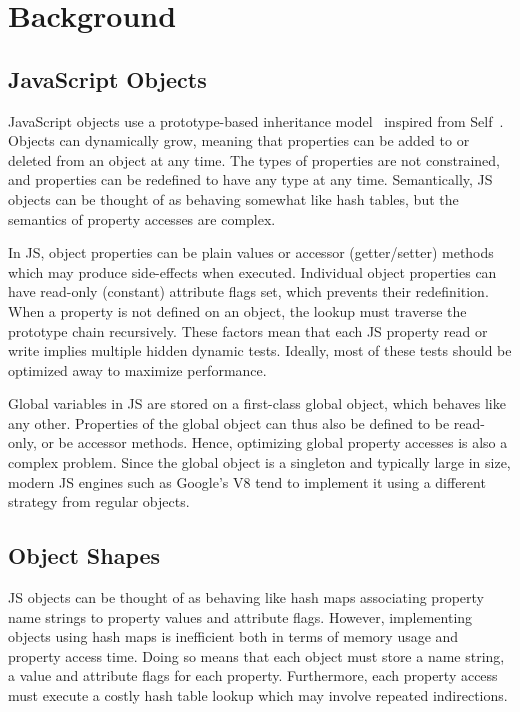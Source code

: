 \documentclass[preprint]{sigplanconf}
\begin{document}
 
\section{Background}


\subsection{JavaScript Objects\label{sec:js_objects}}

JavaScript objects use a prototype-based inheritance model~\cite{es5_spec}
inspired from Self~\cite{self}. Objects can dynamically grow, meaning that
properties can be added to or deleted from an object at any time. The types of
properties are not constrained, and properties can be redefined to have any
type at any time. Semantically, JS objects can be thought of as behaving
somewhat like hash tables, but the semantics of property accesses are complex.

In JS, object properties can be plain values or accessor
(getter/setter) methods which may produce
side-effects when executed. Individual object properties can have read-only
(constant) attribute flags set, which prevents their redefinition.
When a property is not defined on an object, the lookup must traverse the
prototype chain recursively. These factors mean that each JS
property read or write implies multiple hidden dynamic tests. Ideally, most of
these tests should be optimized away to maximize performance.

Global variables in JS are stored on a first-class global object, which behaves
like any other. Properties of the global object can thus also be defined to
be read-only, or be accessor methods. Hence, optimizing global property
accesses is also a complex problem. Since the global object is a singleton and
typically large in size, modern JS engines such as Google's V8 tend to implement
it using a different strategy from regular objects.

\subsection{Object Shapes}

JS objects can be thought of as behaving like hash maps associating property
name strings to property values and attribute flags. However, implementing
objects using hash maps is inefficient both in terms of memory usage and
property access time. Doing so means that each object must store a name
string, a value and attribute flags for each property. Furthermore, each
property access must execute a costly hash table lookup which may involve
repeated indirections.
\end{document}
